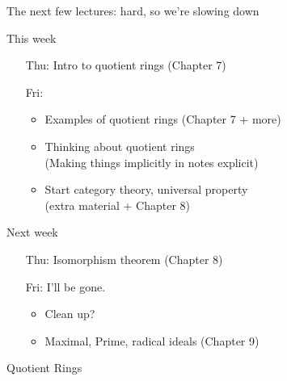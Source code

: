 \documentclass{beamer}
\begin{document}
\begin{frame}{The next few lectures: hard, so we're slowing down}
 
  \begin{block}{This week}
      \begin{itemize}
      \item[Thu:] Intro to quotient rings (Chapter 7)
      \item[Fri:] \begin{itemize}
      \item Examples of quotient rings (Chapter 7 + more)
      \item Thinking about quotient rings \\ \quad(Making things implicitly in notes explicit)
      \item Start category theory, universal property  \\ \quad(extra material + Chapter 8)
      \end{itemize}
      \end{itemize}
  \end{block}
  \begin{block}{Next week}
\begin{itemize}
  \item[Thu:] Isomorphism theorem (Chapter 8)
  \item[Fri:] I'll be gone.
    \begin{itemize}
    \item  Clean up?
      \item Maximal, Prime, radical ideals (Chapter 9)
      \end{itemize}
\end{itemize}        
        

\end{block}
\end{frame}
  


\begin{frame}[plain,c]

\begin{center}

\Huge

Quotient Rings
\end{center}

\end{frame}
\end{document}
